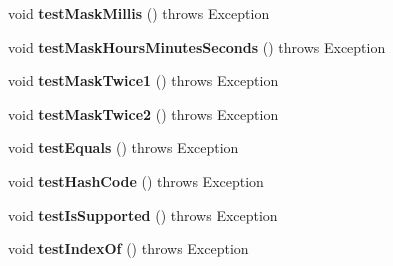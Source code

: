 \begin{DoxyCompactItemize}
\item 
\hypertarget{classorg_1_1joda_1_1time_1_1_test_period_type_a69dda69760a3080ae1e39506ffde101c}{void {\bfseries test\-Mask\-Millis} ()  throws Exception }\label{classorg_1_1joda_1_1time_1_1_test_period_type_a69dda69760a3080ae1e39506ffde101c}

\item 
\hypertarget{classorg_1_1joda_1_1time_1_1_test_period_type_aab8c97e17a9348368f5c646e91c3a539}{void {\bfseries test\-Mask\-Hours\-Minutes\-Seconds} ()  throws Exception }\label{classorg_1_1joda_1_1time_1_1_test_period_type_aab8c97e17a9348368f5c646e91c3a539}

\item 
\hypertarget{classorg_1_1joda_1_1time_1_1_test_period_type_a2d39b0aec3f7750b47dd26da7b80e20b}{void {\bfseries test\-Mask\-Twice1} ()  throws Exception }\label{classorg_1_1joda_1_1time_1_1_test_period_type_a2d39b0aec3f7750b47dd26da7b80e20b}

\item 
\hypertarget{classorg_1_1joda_1_1time_1_1_test_period_type_a255e6b3d03377682529772639c9499da}{void {\bfseries test\-Mask\-Twice2} ()  throws Exception }\label{classorg_1_1joda_1_1time_1_1_test_period_type_a255e6b3d03377682529772639c9499da}

\item 
\hypertarget{classorg_1_1joda_1_1time_1_1_test_period_type_a4a585ba1b9828e26bc53152d6743641c}{void {\bfseries test\-Equals} ()  throws Exception }\label{classorg_1_1joda_1_1time_1_1_test_period_type_a4a585ba1b9828e26bc53152d6743641c}

\item 
\hypertarget{classorg_1_1joda_1_1time_1_1_test_period_type_add744bd602cdf8afd61a8b9a55542211}{void {\bfseries test\-Hash\-Code} ()  throws Exception }\label{classorg_1_1joda_1_1time_1_1_test_period_type_add744bd602cdf8afd61a8b9a55542211}

\item 
\hypertarget{classorg_1_1joda_1_1time_1_1_test_period_type_a3a51bb7446765fa91b1c1ca60823599f}{void {\bfseries test\-Is\-Supported} ()  throws Exception }\label{classorg_1_1joda_1_1time_1_1_test_period_type_a3a51bb7446765fa91b1c1ca60823599f}

\item 
\hypertarget{classorg_1_1joda_1_1time_1_1_test_period_type_af1d6b96e2d9bc29eaf8bccc33e6b729b}{void {\bfseries test\-Index\-Of} ()  throws Exception }\label{classorg_1_1joda_1_1time_1_1_test_period_type_af1d6b96e2d9bc29eaf8bccc33e6b729b}

\end{DoxyCompactItemize}
